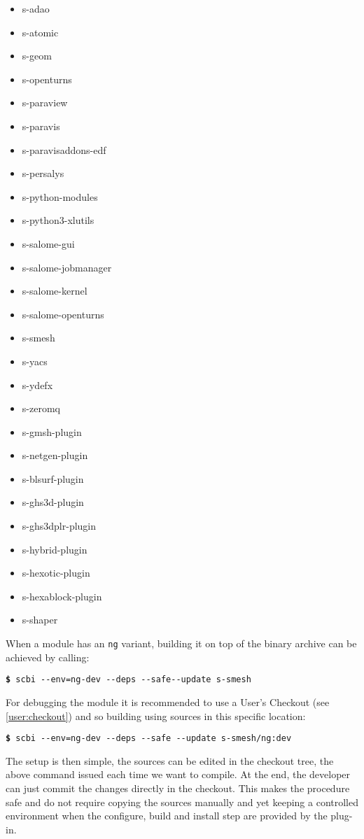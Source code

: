 \documentclass[a4paper,12pt,twoside]{article}
\newcommand{\code}[1]{\texttt{#1}}
\newcommand{\cmd}[1]{\tabto{1cm}\hspace{0.5cm}\texttt{\textbf{\$} #1}}
\newcommand{\ddash}{-{}-}
\begin{document}
\begin{itemize}
	\item s-adao
	\item s-atomic
	\item s-geom
	\item s-openturns
	\item s-paraview
	\item s-paravis
	\item s-paravisaddons-edf
	\item s-persalys
	\item s-python-modules
	\item s-python3-xlutils
	\item s-salome-gui
	\item s-salome-jobmanager
	\item s-salome-kernel
	\item s-salome-openturns
	\item s-smesh
	\item s-yacs
	\item s-ydefx
        \item s-zeromq
        \item s-gmsh-plugin
        \item s-netgen-plugin
        \item s-blsurf-plugin
        \item s-ghs3d-plugin
        \item s-ghs3dplr-plugin
        \item s-hybrid-plugin
        \item s-hexotic-plugin
        \item s-hexablock-plugin
        \item s-shaper
\end{itemize}

When a module has an \code{ng} variant, building it on top of the binary archive can be achieved by calling:

\cmd{scbi \ddash{}env=ng-dev \ddash{}deps \ddash{}safe\ddash{}update s-smesh}

For debugging the module it is recommended to use a User's Checkout (see \ref{user:checkout}) and so building using sources in this specific location:

\cmd{scbi \ddash{}env=ng-dev \ddash{}deps \ddash{}safe \ddash{}update s-smesh/ng:dev}

The setup is then simple, the sources can be edited in the checkout tree, the above command issued each time we want to compile. At the end, the developer can just commit the changes directly in the checkout. This makes the procedure safe and do not require copying the sources manually and yet keeping a controlled environment when the configure, build and install step are provided by the plug-in.
\end{document}
